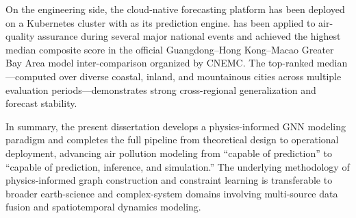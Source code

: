 \begin{abstract*}
On the engineering side, the cloud-native \SystemName{} forecasting platform has been deployed on a Kubernetes cluster with \ModelSurr{} as its prediction engine. \SystemName{} has been applied to air-quality assurance during several major national events and achieved the highest median composite score in the official Guangdong--Hong Kong--Macao Greater Bay Area model inter-comparison organized by CNEMC. The top-ranked median---computed over diverse coastal, inland, and mountainous cities across multiple evaluation periods---demonstrates strong cross-regional generalization and forecast stability.

In summary, the present dissertation develops a physics-informed GNN modeling paradigm and completes the full pipeline from theoretical design to operational deployment, advancing air pollution modeling from ``capable of prediction'' to ``capable of prediction, inference, and simulation.'' The underlying methodology of physics-informed graph construction and constraint learning is transferable to broader earth-science and complex-system domains involving multi-source data fusion and spatiotemporal dynamics modeling.

\end{abstract*}